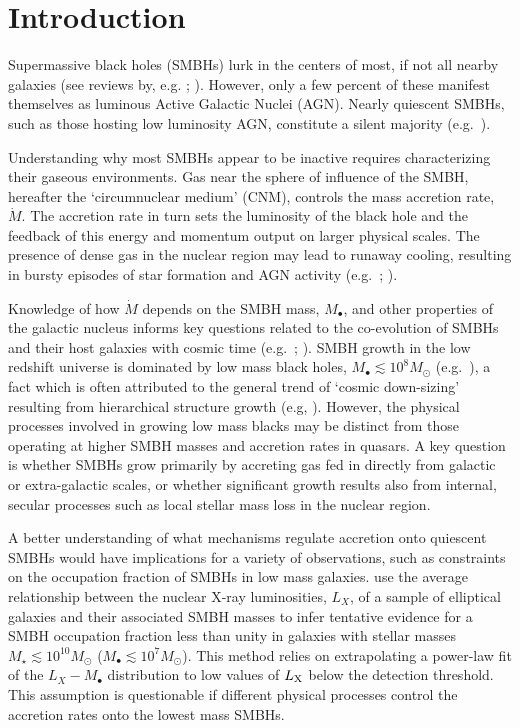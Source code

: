 \documentclass[usenatbib,fleqn]{mn2e}
\newcommand{\Mbh}[1][]{M_{\bullet#1}}
\begin{document}
\section{Introduction}
\label{sec:introduction}

Supermassive black holes (SMBHs) lurk in the centers of most, if not
all nearby galaxies (see reviews by,
e.g. \citealt{KormendyRichstone:1995a};
\citealt{FerrareseFord:2005a}). However, only a few percent of these
manifest themselves as luminous Active Galactic Nuclei (AGN).  Nearly
quiescent SMBHs, such as those hosting low luminosity AGN, constitute
a silent majority (e.g.~\citealt{Ho:2009a}).

Understanding why most SMBHs appear to be inactive requires
characterizing their gaseous environments.  Gas near the sphere of
influence of the SMBH, hereafter the `circumnuclear medium' (CNM),
controls the mass accretion rate, $\dot{M}$.  The accretion rate in
turn sets the luminosity of the black hole and the feedback of this
energy and momentum output on larger physical scales.
The presence of dense gas in the nuclear region may lead to runaway
cooling, resulting in bursty episodes of star formation and AGN
activity (e.g.~\citealt{Ciotti&Ostriker07}; \citealt{Ciotti+10}).

Knowledge of how $\dot{M}$ depends on the SMBH mass, $\Mbh$, and other
properties of the galactic nucleus informs key questions related to
the co-evolution of SMBHs and their host galaxies with cosmic time
(e.g.~\citealt{Kormendy&Ho13}; \citealt{HeckmanBest:2014a}).  SMBH growth
in the low redshift universe is dominated by low mass black holes,
$M_{\bullet} \lesssim 10^{8}M_{\odot}$ (e.g.~\citealt{Heckman+04}), a
fact which is often attributed to the general trend of `cosmic
down-sizing' resulting from hierarchical structure growth (e.g,
\citealt{Gallo+08}).  However, the physical processes involved in
growing low mass blacks may be distinct from those operating at higher
SMBH masses and accretion rates in quasars.  A key question is
whether SMBHs grow primarily by accreting gas fed in directly from
galactic or extra-galactic scales, or whether significant growth
results also from internal, secular processes such as local stellar
mass loss in the nuclear region.

A better understanding of what mechanisms regulate accretion onto
quiescent SMBHs would have implications for a variety of observations,
such as constraints on the occupation fraction of SMBHs in low mass
galaxies.  \citet{Miller+15} use the average relationship between the
nuclear X-ray luminosities, $L_{X}$, of a sample of elliptical
galaxies and their associated SMBH masses to infer tentative evidence for a
SMBH occupation fraction less than unity in galaxies with stellar
masses $M_{\star} \lesssim 10^{10}M_{\odot}$ ($M_{\bullet} \lesssim
10^{7}M_{\odot}$).  This method relies on extrapolating a power-law
fit of the $L_X-\Mbh$ distribution to low values of $L_{\rm X}$ below
the detection threshold.  This assumption is questionable if
different physical processes control the accretion rates onto the
lowest mass SMBHs.
\end{document}

